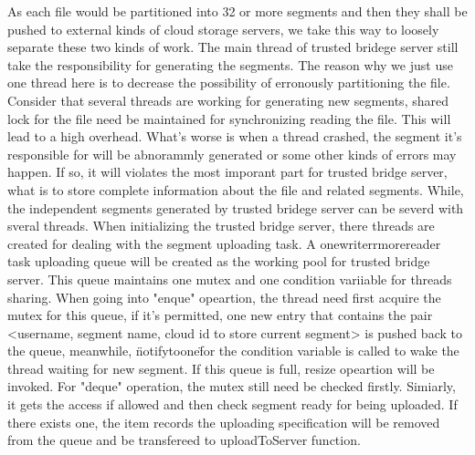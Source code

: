 
As each file would be partitioned into 32 or more segments and then they shall be pushed to external kinds of cloud storage servers, we take this way to loosely separate these two kinds of work. The main thread of trusted bridege server still take the responsibility for generating the segments. The reason why we just use one thread here is to decrease the possibility of erronously partitioning the file. Consider that several threads are working for generating new segments, shared lock for the file need be maintained for synchronizing reading the file. This will lead to a high overhead. What's worse is when a thread crashed, the segment it's responsible for will be abnorammly generated or some other kinds of errors may happen. If so, it will violates the most imporant part for trusted bridge server, what is to store complete information about the file and related segments. While, the independent segments generated by trusted bridege server can be severd with sveral threads. 
When initializing the trusted bridge server, there threads are created for dealing with the segment uploading task. A one\-writerr\-more\-reader task uploading queue will be created as the working pool for trusted bridge server. This queue maintains one mutex and one condition variiable for threads sharing. When going into "enque" opeartion, the thread need first acquire the mutex for this queue, if it's permitted, one new entry that contains the pair <username, segment name, cloud id to store current segment> is pushed back to the queue, meanwhile, \"notify\-to\-one\" for the condition variable is called to wake the thread waiting for new segment. If this queue is full, resize opeartion will be invoked. For "deque" operation, the mutex still need be checked firstly. Simiarly, it gets the access if allowed and then check segment ready for being uploaded. If there exists one, the item records the uploading specification will be removed from the queue and be transfereed to uploadToServer function. 

